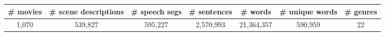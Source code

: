 \begin{tabular}{c c c c c c c  } 
\toprule
\# movies &
\# scene descriptions &
\# speech segs &
\# sentences &
\# words &
\# unique words &
\# genres \\ 
 \midrule
1,070 &
539,827 &
595,227 &
2,570,993 &
21,364,357 &
590,959 &
22 \\ 
\bottomrule
\end{tabular}